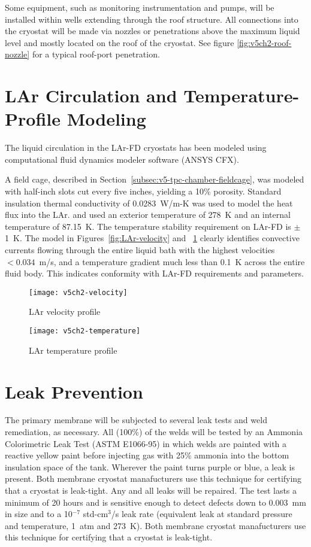 Some equipment, such as monitoring instrumentation and pumps, will be installed within wells extending through the roof structure. All connections into the cryostat will be made via nozzles or penetrations above the maximum liquid level and 
mostly located on the roof of the cryostat.  See figure \ref{fig:v5ch2-roof-nozzle} for a typical roof-port penetration.  


\section{LAr Circulation and Temperature-Profile Modeling}

The  liquid circulation in the LAr-FD cryostats has been modeled using computational fluid dynamics modeler software (ANSYS CFX).

A  field cage, described in Section~\ref{subsec:v5-tpc-chamber-fieldcage}, was modeled with half-inch slots cut every five inches, yielding a 10\% porosity.  Standard insulation thermal conductivity  of 0.0283~W/m-K was used to model the heat flux into the LAr. 
and used an exterior temperature of 278~K and an internal temperature of 87.15~K.  The temperature stability requirement on LAr-FD is $\pm$1~K.   The model  in Figures~\ref{fig:LAr-velocity} and ~\ref{fig:LAr-temperature} clearly identifies convective currents flowing through the entire liquid bath with the highest velocities $< 0.034$~m/s, and a temperature gradient much less than  0.1~K across the entire fluid body.  This 
indicates conformity with LAr-FD requirements and parameters.

\begin{figure}[htbp]
\centering
\texttt{[image: v5ch2-velocity]}
\caption{LAr velocity profile} 
\label{fig:LAr-velocity}

\centering
\texttt{[image: v5ch2-temperature]}
\caption{LAr temperature profile} 
\label{fig:LAr-temperature}
\end{figure}



\section{Leak Prevention}
The primary membrane will be subjected to several leak tests and weld remediation, as necessary.  
All (100\%) of the welds will be tested by an Ammonia Colorimetric Leak Test (ASTM E1066-95) in which welds are painted with a reactive yellow paint before injecting gas with 25\% ammonia into the bottom insulation space of the tank.  Wherever the paint turns purple or blue, a leak is present. Both membrane cryostat manafucturers use this technique for certifying that a cryostat is leak-tight. Any and all leaks will be repaired. The test lasts a minimum of 20 hours and is sensitive enough to detect defects down to 0.003~mm in size and to a 10$^{-7}$ std-cm$^3$/s leak rate (equivalent leak at standard pressure and temperature, 1~atm and 273~K). 
Both membrane cryostat manafucturers use this technique for certifying that a cryostat is leak-tight.

